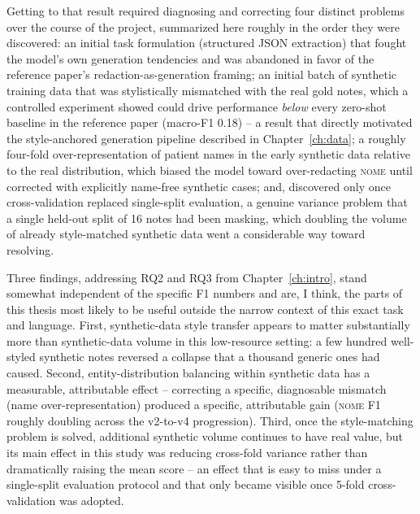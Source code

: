 \documentclass[12pt,a4paper]{report}
\newcommand{\NOME}{\textsc{nome}}
\begin{document}
Getting to that result required diagnosing and correcting four distinct problems over the course of the project, summarized here roughly in the order they were discovered: an initial task formulation (structured JSON extraction) that fought the model's own generation tendencies and was abandoned in favor of the reference paper's redaction-as-generation framing; an initial batch of synthetic training data that was stylistically mismatched with the real gold notes, which a controlled experiment showed could drive performance \emph{below} every zero-shot baseline in the reference paper (macro-F1 0.18) -- a result that directly motivated the style-anchored generation pipeline described in Chapter~\ref{ch:data}; a roughly four-fold over-representation of patient names in the early synthetic data relative to the real distribution, which biased the model toward over-redacting \NOME{} until corrected with explicitly name-free synthetic cases; and, discovered only once cross-validation replaced single-split evaluation, a genuine variance problem that a single held-out split of 16 notes had been masking, which doubling the volume of already style-matched synthetic data went a considerable way toward resolving.

Three findings, addressing RQ2 and RQ3 from Chapter~\ref{ch:intro}, stand somewhat independent of the specific F1 numbers and are, I think, the parts of this thesis most likely to be useful outside the narrow context of this exact task and language. First, synthetic-data style transfer appears to matter substantially more than synthetic-data volume in this low-resource setting: a few hundred well-styled synthetic notes reversed a collapse that a thousand generic ones had caused. Second, entity-distribution balancing within synthetic data has a measurable, attributable effect -- correcting a specific, diagnosable mismatch (name over-representation) produced a specific, attributable gain (\NOME{} F1 roughly doubling across the v2-to-v4 progression). Third, once the style-matching problem is solved, additional synthetic volume continues to have real value, but its main effect in this study was reducing cross-fold variance rather than dramatically raising the mean score -- an effect that is easy to miss under a single-split evaluation protocol and that only became visible once 5-fold cross-validation was adopted.
\end{document}
